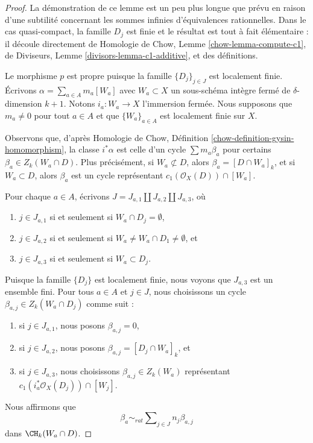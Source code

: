 \begin{proof}
La démonstration de ce lemme est un peu plus longue que prévu
en raison d'une subtilité concernant les sommes infinies d'équivalences rationnelles.
Dans le cas quasi-compact, la famille $D_j$ est finie et le résultat
est tout à fait élémentaire : il découle directement de
Homologie de Chow, Lemme \ref{chow-lemma-compute-c1}, de
Diviseurs, Lemme \ref{divisors-lemma-c1-additive}, et des définitions.

\medskip\noindent
Le morphisme $p$ est propre puisque la famille $\{D_j\}_{j \in J}$
est localement finie. Écrivons $\alpha = \sum_{a \in A} m_a [W_a]$
avec $W_a \subset X$ un sous-schéma intègre fermé de
$\delta$-dimension $k + 1$.
Notons $i_a : W_a \to X$ l'immersion fermée.
Nous supposons que $m_a \not = 0$ pour tout $a \in A$ et que
$\{W_a\}_{a \in A}$ est localement finie sur $X$.

\medskip\noindent
Observons que, d'après
Homologie de Chow, Définition \ref{chow-definition-gysin-homomorphism},
la classe $i^*\alpha$ est celle d'un cycle
$\sum m_a\beta_a$ pour certains $\beta_a \in Z_k(W_a \cap D)$.
Plus précisément, si $W_a \not \subset D$, alors $\beta_a = [D \cap W_a]_k$,
et si $W_a \subset D$, alors $\beta_a$ est un cycle
représentant $c_1(\mathcal{O}_X(D)) \cap [W_a]$.

\medskip\noindent
Pour chaque $a \in A$, écrivons $J = J_{a, 1} \amalg J_{a, 2} \amalg J_{a, 3}$,
où
\begin{enumerate}
\item $j \in J_{a, 1}$ si et seulement si $W_a \cap D_j = \emptyset$,
\item $j \in J_{a, 2}$ si et seulement si
$W_a \not = W_a \cap D_1 \not = \emptyset$, et
\item $j \in J_{a, 3}$ si et seulement si $W_a \subset D_j$.
\end{enumerate}
Puisque la famille $\{D_j\}$ est localement finie, nous voyons que
$J_{a, 3}$ est un ensemble fini. Pour tous $a \in A$ et $j \in J$,
nous choisissons un cycle $\beta_{a, j} \in Z_k(W_a \cap D_j)$ comme suit :
\begin{enumerate}
\item si $j \in J_{a, 1}$, nous posons $\beta_{a, j} = 0$,
\item si $j \in J_{a, 2}$, nous posons $\beta_{a, j} = [D_j \cap W_a]_k$, et
\item si $j \in J_{a, 3}$, nous choisissons $\beta_{a, j} \in Z_k(W_a)$
représentant $c_1(i_a^*\mathcal{O}_X(D_j)) \cap [W_j]$.
\end{enumerate}
Nous affirmons que
$$
\beta_a \sim_{rat}
\sum\nolimits_{j \in J} n_j \beta_{a, j}
$$
dans $\CH_k(W_a \cap D)$.


\end{proof}
